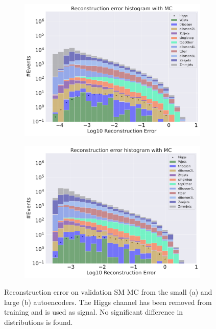 \begin{figure}[!htb]
    \centering
    \begin{subfigure}{.45\textwidth}
        \includegraphics[width=\textwidth]{Figures/AE_testing/small/b_data_recon_big_rm3_feats_sig_higgs.pdf}
        \caption{}
        \label{fig:ae_small_higgs}
    \end{subfigure}
    \hfill 
    \begin{subfigure}{.45\textwidth}
        \includegraphics[width=\textwidth]{Figures/AE_testing/big/b_data_recon_big_rm3_feats_sig_higgs.pdf}
        \caption{ }
        \label{fig:ae_big_higgs}
    \end{subfigure}
    \hfill 
    \caption[AE | Reconstruction error using Higgs channel as signal]{Reconstruction error on validation SM MC from the small (a) and large (b) autoencoders. The Higgs channel has been removed from training and 
    is used as signal. No significant difference in distributions is found.  } 
    \label{fig:ae_big_channel_1}
    
\end{figure}

